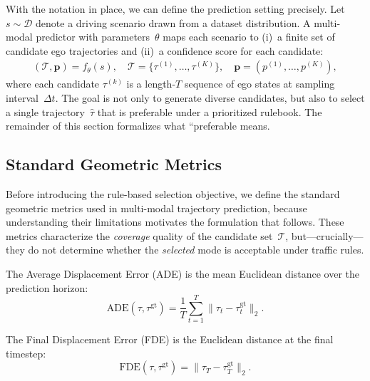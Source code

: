 With the notation in place, we can define the prediction setting precisely. Let $s \sim \mathcal{D}$ denote a driving scenario drawn from a dataset distribution.  A multi-modal predictor with parameters~$\theta$ maps each scenario to (i)~a finite set of candidate ego trajectories and (ii)~a
confidence score for each candidate:
\begin{align}
(\mathcal{T}, \mathbf{p}) = f_\theta(s), \quad
\mathcal{T} = \{\tau^{(1)},\ldots,\tau^{(K)}\}, \quad
\mathbf{p} = (p^{(1)}, \ldots, p^{(K)}),\nonumber
\end{align}
where each candidate $\tau^{(k)}$ is a length-$T$ sequence of ego states at sampling interval~$\Delta t$.  The goal is not only to generate diverse candidates, but also to select a single trajectory~$\hat{\tau}$ that is preferable under a prioritized rulebook.  The remainder of this section
formalizes what ``preferable means.

\subsection{Standard Geometric Metrics}
\label{subsec:geometric_metrics}

Before introducing the rule-based selection objective, we define the standard geometric metrics used in multi-modal trajectory prediction, because understanding their limitations motivates the formulation that follows. These metrics characterize the \emph{coverage} quality of the candidate set~$\mathcal{T}$, but---crucially---they do not determine whether the \emph{selected} mode is acceptable under traffic rules.

\begin{definition} The Average Displacement Error (ADE) is the mean Euclidean distance over the prediction horizon:
\begin{equation}
\text{ADE}(\tau, \tau^{\mathrm{gt}}) = \frac{1}{T} \sum_{t=1}^T \| \tau_t - \tau^{\mathrm{gt}}_t \|_2.
\end{equation}
\end{definition}

\begin{definition} The Final Displacement Error (FDE) is the Euclidean distance at the final timestep:
\begin{equation}
\text{FDE}(\tau, \tau^{\mathrm{gt}}) = \| \tau_T - \tau^{\mathrm{gt}}_T \|_2.
\end{equation}
\end{definition}


